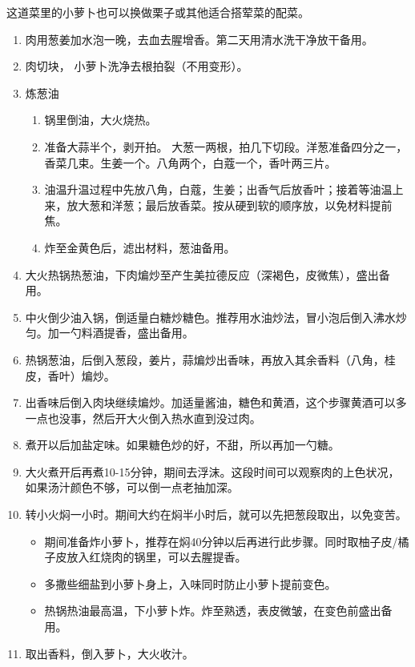 这道菜里的小萝卜也可以换做栗子或其他适合搭荤菜的配菜。

\begin{enumerate}
    \item 肉用葱姜加水泡一晚，去血去腥增香。第二天用清水洗干净放干备用。
    \item 肉切块， 小萝卜洗净去根拍裂（不用变形）。
    \item 炼葱油
    \begin{enumerate}
        \item 锅里倒油，大火烧热。
        \item 准备大蒜半个，剥开拍。 大葱一两根，拍几下切段。洋葱准备四分之一，香菜几束。生姜一个。八角两个，白蔻一个，香叶两三片。
        \item 油温升温过程中先放八角，白蔻，生姜；出香气后放香叶；接着等油温上来，放大葱和洋葱；最后放香菜。按从硬到软的顺序放，以免材料提前焦。
        \item 炸至金黄色后，滤出材料，葱油备用。
    \end{enumerate}
    \item 大火热锅热葱油，下肉煸炒至产生美拉德反应（深褐色，皮微焦），盛出备用。
    \item 中火倒少油入锅，倒适量白糖炒糖色。推荐用水油炒法，冒小泡后倒入沸水炒匀。加一勺料酒提香，盛出备用。
    \item 热锅葱油，后倒入葱段，姜片，蒜煸炒出香味，再放入其余香料（八角，桂皮，香叶）煸炒。
    \item 出香味后倒入肉块继续煸炒。加适量酱油，糖色和黄酒，这个步骤黄酒可以多一点也没事，然后开大火倒入热水直到没过肉。
    \item 煮开以后加盐定味。如果糖色炒的好，不甜，所以再加一勺糖。
    \item 大火煮开后再煮10-15分钟，期间去浮沫。这段时间可以观察肉的上色状况，如果汤汁颜色不够，可以倒一点老抽加深。
    \item 转小火焖一小时。期间大约在焖半小时后，就可以先把葱段取出，以免变苦。
    \begin{itemize}
        \item 期间准备炸小萝卜，推荐在焖40分钟以后再进行此步骤。同时取柚子皮/橘子皮放入红烧肉的锅里，可以去腥提香。
        \item 多撒些细盐到小萝卜身上，入味同时防止小萝卜提前变色。
        \item 热锅热油最高温，下小萝卜炸。炸至熟透，表皮微皱，在变色前盛出备用。
    \end{itemize}
    \item 取出香料，倒入萝卜，大火收汁。
\end{enumerate}


